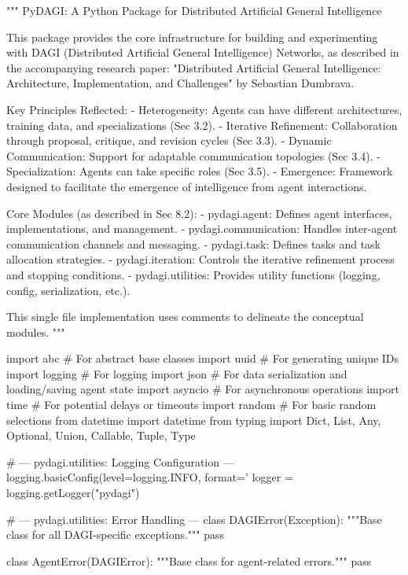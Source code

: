 \documentclass{amsbook}
\theoremstyle{definition}
\theoremstyle{remark}
\numberwithin{equation}{chapter} %
\begin{document}
\begin{python}
    """
PyDAGI: A Python Package for Distributed Artificial General Intelligence

This package provides the core infrastructure for building and experimenting with
DAGI (Distributed Artificial General Intelligence) Networks, as described in
the accompanying research paper: "Distributed Artificial General Intelligence:
Architecture, Implementation, and Challenges" by Sebastian Dumbrava.

Key Principles Reflected:
- Heterogeneity: Agents can have different architectures, training data, and specializations (Sec 3.2).
- Iterative Refinement: Collaboration through proposal, critique, and revision cycles (Sec 3.3).
- Dynamic Communication: Support for adaptable communication topologies (Sec 3.4).
- Specialization: Agents can take specific roles (Sec 3.5).
- Emergence: Framework designed to facilitate the emergence of intelligence from agent interactions.

Core Modules (as described in Sec 8.2):
- pydagi.agent: Defines agent interfaces, implementations, and management.
- pydagi.communication: Handles inter-agent communication channels and messaging.
- pydagi.task: Defines tasks and task allocation strategies.
- pydagi.iteration: Controls the iterative refinement process and stopping conditions.
- pydagi.utilities: Provides utility functions (logging, config, serialization, etc.).

This single file implementation uses comments to delineate the conceptual modules.
"""

import abc      # For abstract base classes
import uuid     # For generating unique IDs
import logging  # For logging
import json     # For data serialization and loading/saving agent state
import asyncio  # For asynchronous operations
import time     # For potential delays or timeouts
import random   # For basic random selections
from datetime import datetime
from typing import Dict, List, Any, Optional, Union, Callable, Tuple, Type

# --- pydagi.utilities: Logging Configuration ---
logging.basicConfig(level=logging.INFO, format='%
logger = logging.getLogger("pydagi")

# --- pydagi.utilities: Error Handling ---
class DAGIError(Exception):
    """Base class for all DAGI-specific exceptions."""
    pass

class AgentError(DAGIError):
    """Base class for agent-related errors."""
    pass


\end{python}
\end{document}
